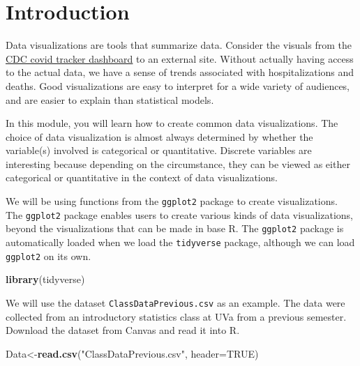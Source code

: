 \documentclass[
]{book}
\newenvironment{Shaded}{\begin{snugshade}}{\end{snugshade}}
\newcommand{\AttributeTok}[1]{\textcolor[rgb]{0.13,0.29,0.53}{#1}}
\newcommand{\ConstantTok}[1]{\textcolor[rgb]{0.56,0.35,0.01}{#1}}
\newcommand{\FunctionTok}[1]{\textcolor[rgb]{0.13,0.29,0.53}{\textbf{#1}}}
\newcommand{\NormalTok}[1]{#1}
\newcommand{\OtherTok}[1]{\textcolor[rgb]{0.56,0.35,0.01}{#1}}
\newcommand{\StringTok}[1]{\textcolor[rgb]{0.31,0.60,0.02}{#1}}
\begin{document}
\hypertarget{introduction-1}{%
\section{Introduction}\label{introduction-1}}

Data visualizations are tools that summarize data. Consider the visuals from the \href{https://covid.cdc.gov/covid-data-tracker/\#datatracker-home}{CDC covid tracker dashboard} to an external site. Without actually having access to the actual data, we have a sense of trends associated with hospitalizations and deaths. Good visualizations are easy to interpret for a wide variety of audiences, and are easier to explain than statistical models.

In this module, you will learn how to create common data visualizations. The choice of data visualization is almost always determined by whether the variable(s) involved is categorical or quantitative. Discrete variables are interesting because depending on the circumstance, they can be viewed as either categorical or quantitative in the context of data visualizations.

We will be using functions from the \texttt{ggplot2} package to create visualizations. The \texttt{ggplot2} package enables users to create various kinds of data visualizations, beyond the visualizations that can be made in base R. The \texttt{ggplot2} package is automatically loaded when we load the \texttt{tidyverse} package, although we can load \texttt{ggplot2} on its own.

\begin{Shaded}
\begin{Highlighting}[]
\FunctionTok{library}\NormalTok{(tidyverse)}
\end{Highlighting}
\end{Shaded}

We will use the dataset \texttt{ClassDataPrevious.csv} as an example. The data were collected from an introductory statistics class at UVa from a previous semester. Download the dataset from Canvas and read it into R.

\begin{Shaded}
\begin{Highlighting}[]
\NormalTok{Data}\OtherTok{\textless{}{-}}\FunctionTok{read.csv}\NormalTok{(}\StringTok{"ClassDataPrevious.csv"}\NormalTok{, }\AttributeTok{header=}\ConstantTok{TRUE}\NormalTok{)}
\end{Highlighting}
\end{Shaded}
\end{document}
